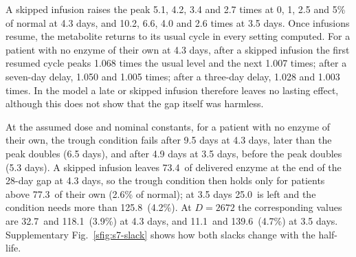 A skipped infusion raises the peak 5.1, 4.2, 3.4 and 2.7 times at 0, 1, 2.5 and 5\% of normal at
4.3 days, and 10.2, 6.6, 4.0 and 2.6 times at 3.5 days. Once infusions resume, the metabolite returns
to its usual cycle in every setting computed. For a patient with no enzyme of their own at 4.3 days,
after a skipped infusion the first resumed cycle peaks 1.068 times the usual level and the next
1.007 times; after a seven-day delay, 1.050 and 1.005 times; after a three-day delay, 1.028 and
1.003 times. In the model a late or skipped infusion therefore leaves no lasting effect, although
this does not show that the gap itself was harmless.

At the assumed dose and nominal constants, for a patient with no enzyme of their own, the trough
condition fails after 9.5 days at 4.3 days, later than the peak doubles (6.5 days), and after 4.9
days at 3.5 days, before the peak doubles (5.3 days). A skipped infusion
leaves 73.4\um\ of delivered enzyme at the end of the 28-day gap at 4.3 days, so the trough condition
then holds only for patients above 77.3\um\ of their own (2.6\% of normal); at 3.5 days 25.0\um\ is
left and the condition needs more than 125.8\um\ (4.2\%). At $D=2672$ the corresponding values are
32.7\um\ and 118.1\um\ (3.9\%) at 4.3 days, and 11.1\um\ and 139.6\um\ (4.7\%) at 3.5 days.
Supplementary Fig.~\ref{sfig:s7-slack} shows how both slacks change with the half-life.

